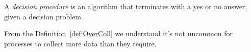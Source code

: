 
A \textit{decision procedure} is an algorithm that terminates with a yes or no answer, given a decision problem.\cite{decisionproceduresbook} 

From the Definition~\ref{def:OverColl} we understand it's not uncommon for processes to collect more data than they require. 












